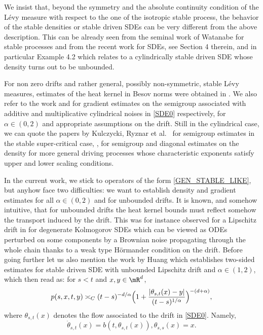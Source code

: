 {We insist that, beyond the symmetry and the absolute continuity condition of the Lévy measure with respect to the one of the isotropic stable process, the behavior of the stable densities or stable driven SDEs can be very different from the above description. This can be 	already seen from the seminal work of Watanabe \cite{wata:07} for stable processes and from the recent work \cite{knop:kuli:schi:20} for SDEs, see Section 4 therein, and in particular Example 4.2 which relates to a cylindrically stable driven SDE whose density turns out to be unbounded.
}

{
For non zero drifts and rather general, possibly non-symmetric, stable Lévy measures, estimates of the heat kernel in Besov norms were obtained in \cite{De-Fo}.
We also refer to the work \cite{kuli:pesz:prio:20} and \cite{CHZ} for gradient estimates on the semigroup associated
with additive and multiplicative cylindrical noises in \eqref{SDE0} respectively, for $\alpha\in (0,2) $ and appropriate assumptions on the drift. Still in the cylindrical case, we can quote the papers by Kulczycki, Ryznar et al.\ \cite{kulc:ryzn:szto:21} for semigroup estimates in the stable super-critical case, \cite{kulc:ryzn:19}, \cite{kulc:kuli:ryzn:21} for semigroup and diagonal estimates on the density for more general driving processes whose characteristic exponents satisfy upper and lower scaling conditions.
}

In the current work, {we stick to operators of the form \eqref{GEN_STABLE_LIKE}, but anyhow face two difficulties:} we want to establish {density and} gradient estimates for all $\alpha\in (0,2) $ and for unbounded drifts. It is known, and somehow intuitive, that for unbounded drifts the heat kernel bounds must reflect somehow the transport induced by the drift. This was for instance observed for a Lipschitz drift in \cite{dela:meno:10} for degenerate Kolmogorov SDEs which can be viewed as ODEs perturbed on some components by a Brownian noise propagating through the whole chain thanks to a weak type Hörmander condition on the drift.
Before going further let us also mention the work by Huang \cite{huan:15}
which establishes two-sided estimates for stable driven SDE with unbounded Lipschitz drift and $\alpha\in(1,2)$,
which then read as: for $s<t$ and $x,y\in\mR^d$,
\begin{equation}
\label{SECOND_TW}
p(s,x,t,y)\asymp_C (t-s)^{-d/\alpha} \Bigl(1+\frac{|\theta_{s,t}(x)-y|}{(t-s)^{1/\alpha}}\Bigr)^{-(d+\alpha)},
\end{equation}
where $\theta_{s,t}(x) $ denotes the flow associated to the drift in \eqref{SDE0}. Namely,
\[
\dot \theta_{s,t}(x)=b(t,\theta_{s,t}(x)), \theta_{s,s}(x)=x.
\]

